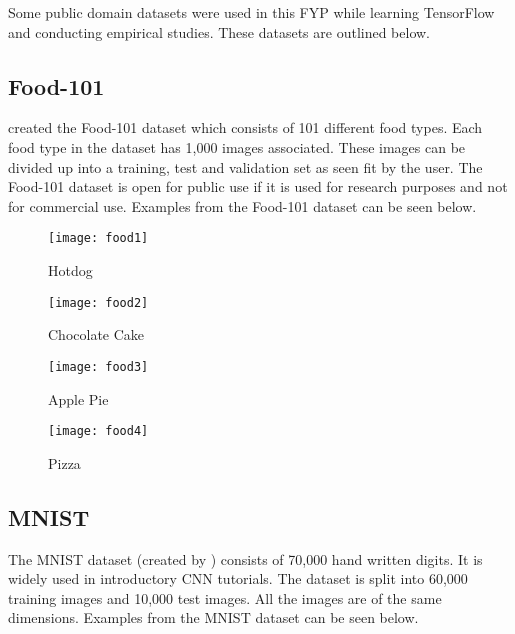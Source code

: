 Some public domain datasets were used in this FYP while learning TensorFlow and conducting empirical studies.
These datasets are outlined below.
\tocless\subsection{Food-101}
\parencite{food101} created the Food-101 dataset which consists of 101 different food types.
Each food type in the dataset has 1,000 images associated.
These images can be divided up into a training, test and validation set as seen fit by the user.
The Food-101 dataset is open for public use if it is used for research purposes and not for commercial use.
Examples from the Food-101 dataset can be seen below.

\begin{figure}[h] 
  \label{food} 
  \begin{minipage}[b]{0.25\linewidth}
    \centering
    \texttt{[image: food1]} 
    \caption{Hotdog} 
    \vspace{4ex}
  \end{minipage}%
  \begin{minipage}[b]{0.25\linewidth}
    \centering
    \texttt{[image: food2]} 
    \caption{Chocolate Cake} 
  \label{fig:page2}
    \vspace{4ex}
  \end{minipage} 
  \begin{minipage}[b]{0.25\linewidth}
    \centering
    \texttt{[image: food3]} 
    \caption{Apple Pie} 
    \vspace{4ex}
  \end{minipage}%
  \begin{minipage}[b]{0.25\linewidth}
    \centering
    \texttt{[image: food4]} 
    \caption{Pizza} 
    \vspace{4ex}
  \end{minipage} 
\end{figure}

\tocless\subsection{MNIST}
The MNIST dataset (created by \parencite{mnist}) consists of 70,000 hand written digits.
It is widely used in introductory CNN tutorials.
The dataset is split into 60,000 training images and 10,000 test images.
All the images are of the same dimensions.
Examples from the MNIST dataset can be seen below.

